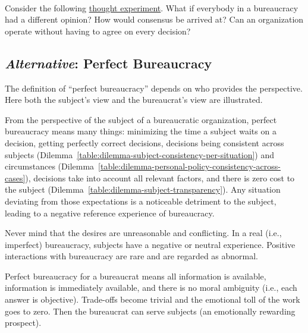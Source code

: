 \ \\

Consider the following 
\href{https://en.wikipedia.org/wiki/Thought_experiment}{thought experiment}. 
\iftoggle{WPinmargin}{\marginpar{$>$Wikipedia: thought experiment}}{}
What if everybody in a bureaucracy had a different opinion? How would consensus be arrived at? Can an organization operate without having to agree on every decision? 



\subsection*{\textit{Alternative}: Perfect Bureaucracy}

The definition of ``perfect bureaucracy'' depends on who provides the perspective. Here both the subject's view and the bureaucrat's view are illustrated. 

From the perspective of the subject of a bureaucratic organization, perfect bureaucracy means many things: minimizing the time a subject waits on a decision, getting perfectly correct decisions, decisions being consistent across subjects (Dilemma~\ref{table:dilemma-subject-consistency-per-situation})
%
and circumstances (Dilemma~\ref{table:dilemma-personal-policy-consistency-across-cases}), decisions take into account all relevant factors, and there is zero cost to the subject (Dilemma~\ref{table:dilemma-subject-transparency}). 
%
Any situation deviating from those expectations is a noticeable detriment to the subject, leading to a negative reference experience of bureaucracy. 

Never mind that the desires are unreasonable and conflicting. In a real (i.e., imperfect) bureaucracy, subjects have a negative or neutral experience. Positive interactions with bureaucracy are rare and are regarded as abnormal.

Perfect bureaucracy for a bureaucrat means all information is available, information is immediately available, and there is no moral ambiguity (i.e., each answer is objective). Trade-offs become trivial and the emotional toll of the work goes to zero. Then the bureaucrat can serve subjects (an emotionally rewarding prospect). 

